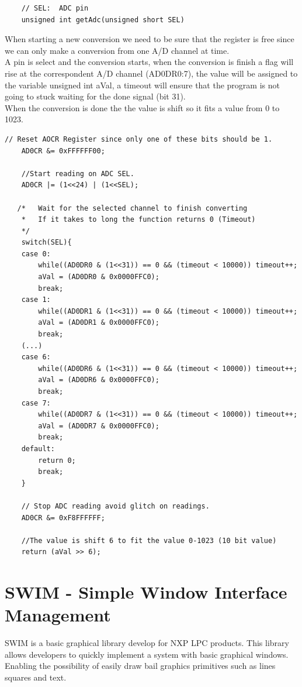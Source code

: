 \begin{lstlisting}
	// SEL:  ADC pin 
	unsigned int getAdc(unsigned short SEL)
\end{lstlisting}

When starting a new conversion we need to be sure that the register is free since we can only make a conversion from one A/D channel at time. \\ A pin is select and the conversion starts, when the conversion is finish a flag will rise at the correspondent A/D channel (AD0DR0:7), the value will be assigned to the variable unsigned int aVal, a timeout will ensure that the program is not going to stuck waiting for the done signal (bit 31).\\ When the conversion is done the the value is shift so it fits a value from 0 to 1023.

\begin{lstlisting}
// Reset AOCR Register since only one of these bits should be 1.
	AD0CR &= 0xFFFFFF00;

	//Start reading on ADC SEL.
	AD0CR |= (1<<24) | (1<<SEL);

   /*	Wait for the selected channel to finish converting
	*	If it takes to long the function returns 0 (Timeout)
	*/
	switch(SEL){
	case 0:
		while((AD0DR0 & (1<<31)) == 0 && (timeout < 10000)) timeout++;
		aVal = (AD0DR0 & 0x0000FFC0);
		break;
	case 1:
		while((AD0DR1 & (1<<31)) == 0 && (timeout < 10000)) timeout++;
		aVal = (AD0DR1 & 0x0000FFC0);
		break;
	(...)
	case 6:
		while((AD0DR6 & (1<<31)) == 0 && (timeout < 10000)) timeout++;
		aVal = (AD0DR6 & 0x0000FFC0);
		break;
	case 7:
		while((AD0DR7 & (1<<31)) == 0 && (timeout < 10000)) timeout++;
		aVal = (AD0DR7 & 0x0000FFC0);
		break;
	default:
		return 0;
		break;
	}

	// Stop ADC reading avoid glitch on readings.
	AD0CR &= 0xF8FFFFFF;

	//The value is shift 6 to fit the value 0-1023 (10 bit value)
	return (aVal >> 6);
\end{lstlisting}

\newpage

\section{SWIM - Simple Window Interface Management}

SWIM is a basic graphical library develop for NXP LPC products. This library allows developers to quickly implement a system with basic graphical windows. \\ Enabling the possibility of easily draw bail graphics primitives such as lines squares and text.

